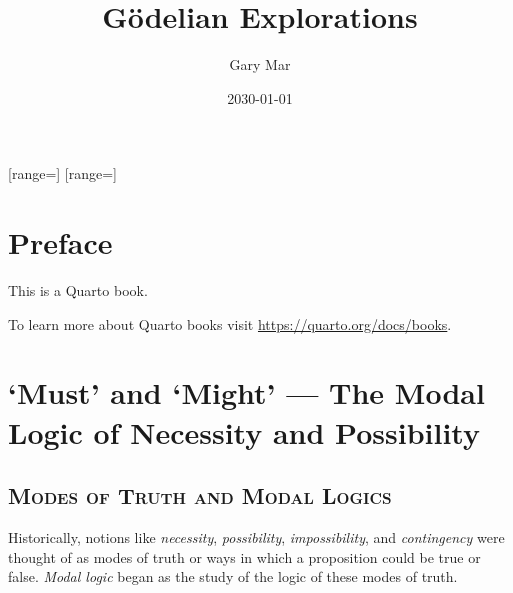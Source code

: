 \documentclass[
  12pt,
  letterpaper,
  DIV=11,
  numbers=noendperiod,
  twoside]{scrreprt}
\title{Gödelian Explorations}
\author{Gary Mar}
\date{2030-01-01}
\renewcommand*\contentsname{Table of contents}
\newcommand\contentsname{Table of contents}
\theoremstyle{remark}
\begin{document}
\maketitle

\renewcommand\phantomsection{}


\setlength{\parskipto}{\parskip}

\setlength{\floatsep}{0cm}
\setlength{\textfloatsep}{0cm}
\setlength{\intextsep}{0cm}

[range=\smwhtdiamond]
[range=]

\raggedbottom

\renewcommand*\contentsname{Table of contents}
{
\hypersetup{linkcolor=}
\setcounter{tocdepth}{2}
\tableofcontents
}

\chapter*{Preface}\label{preface}


This is a Quarto book.

To learn more about Quarto books visit
\url{https://quarto.org/docs/books}.


\chapter{`Must' and `Might' --- The Modal Logic of Necessity and
Possibility}\label{must-and-might-the-modal-logic-of-necessity-and-possibility}

\section{\texorpdfstring{\textsc{Modes of Truth and Modal
Logics}}{Modes of Truth and Modal Logics}}\label{modes-of-truth-and-modal-logics}

Historically, notions like \emph{necessity}, \emph{possibility},
\emph{impossibility}, and \emph{contingency} were thought of as modes of
truth or ways in which a proposition could be true or false. \emph{Modal
logic} began as the study of the logic of these modes of truth.
\end{document}
